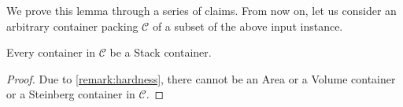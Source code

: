 We prove this lemma through a series of claims. From now on, let us consider an arbitrary container packing $\mathcal C$ of a subset of the above input instance.
\begin{claim}
    Every container in $\mathcal C$  be a Stack container.
\end{claim}
\begin{proof}
    Due to \cref{remark:hardness}, there cannot be an Area or a Volume container or a Steinberg container in $\mathcal C$. 
\end{proof}
    
    
    
